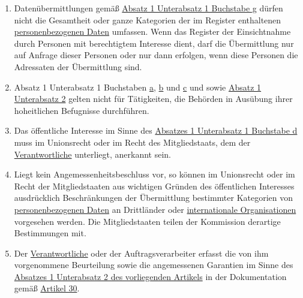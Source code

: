 \begin{enumerate}
  \item Datenübermittlungen gemäß \hyperref[itm:49-1-1g]{Absatz 1 Unterabsatz 1 Buchstabe g} dürfen nicht die Gesamtheit
   oder ganze Kategorien der im Register enthaltenen \hyperref[itm:04-1]{personenbezogenen Daten} umfassen. Wenn das Register der
   Einsichtnahme durch Personen mit berechtigtem Interesse dient, darf die Übermittlung nur auf Anfrage dieser Personen
   oder nur dann erfolgen, wenn diese Personen die Adressaten der Übermittlung sind.
  \label{itm:49-2}

  \item Absatz 1 Unterabsatz 1 Buchstaben \hyperref[itm:49-1-1a]{a}, \hyperref[itm:49-1-1b]{b} und \hyperref
   [itm:49-1-1c]{c} und sowie \hyperref[itm:49-1-2]{Absatz 1 Unterabsatz 2} gelten nicht für Tätigkeiten, die Behörden
   in Ausübung ihrer hoheitlichen Befugnisse durchführen.
  \label{itm:49-3}

  \item Das öffentliche Interesse im Sinne des \hyperref[itm:49-1-1d]{Absatzes 1 Unterabsatz 1 Buchstabe d} muss im
   Unionsrecht oder im Recht des Mitgliedstaats, dem der \hyperref[itm:04-7]{Verantwortliche} unterliegt, anerkannt sein.
  \label{itm:49-4}

  \item Liegt kein Angemessenheitsbeschluss vor, so können im Unionsrecht oder im Recht der Mitgliedstaaten aus
   wichtigen Gründen des öffentlichen Interesses ausdrücklich Beschränkungen der Übermittlung bestimmter Kategorien von
   \hyperref[itm:04-1]{personenbezogenen Daten} an Drittländer oder \hyperref[itm:04-29]{internationale Organisationen} vorgesehen werden. Die Mitgliedstaaten
   teilen der Kommission derartige Bestimmungen mit.
  \label{itm:49-5}

  \item Der \hyperref[itm:04-7]{Verantwortliche} oder der Auftragsverarbeiter erfasst die von ihm vorgenommene Beurteilung sowie die
   angemessenen Garantien im Sinne des \hyperref[itm:49-1-2]{Absatzes 1 Unterabsatz 2 des vorliegenden Artikels} in der
   Dokumentation gemäß \hyperref[ch:30]{Artikel 30}.
  \label{itm:49-6}

\end{enumerate}


